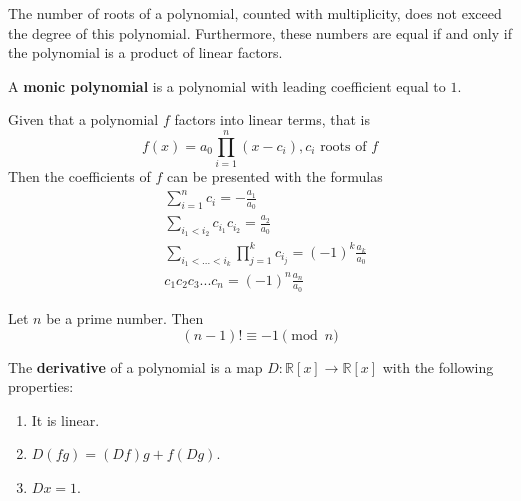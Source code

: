 \documentclass{article}
\begin{document}
      \begin{theorem}
        The number of roots of a polynomial, counted with multiplicity, does not exceed the degree of this polynomial. Furthermore, these numbers are equal if and only if the polynomial is a product of linear factors.
      \end{theorem}

      \begin{definition}
        A \textbf{monic polynomial} is a polynomial with leading coefficient equal to $1$. 
      \end{definition}

      \begin{theorem}
        Given that a polynomial $f$ factors into linear terms, that is 
        \begin{equation}
          f(x) = a_0 \prod_{i = 1}^{n} (x - c_i), c_i \text{ roots of } f
        \end{equation}
        Then the coefficients of $f$ can be presented with the formulas
        \begin{align*}
          & \sum_{i=1}^n c_i = - \frac{a_1}{a_0} \\
          & \sum_{i_1 < i_2} c_{i_1} c_{i_2} = \frac{a_2}{a_0} \\
          & \sum_{i_1< ...< i_k} \prod_{j = 1}^{k} c_{i_j} = (-1)^k \frac{a_k}{a_0} \\
          & c_1 c_2 c_3 ... c_n = (-1)^n \frac{a_n}{a_0}
        \end{align*}
      \end{theorem}

      \begin{theorem}
        Let $n$ be a prime number. Then 
        \begin{equation}
          (n-1)! \equiv -1 \pmod{n}
        \end{equation}
      \end{theorem}

      \begin{definition}
        The \textbf{derivative} of a polynomial is a map $D: \mathbb{R}[x] \longrightarrow \mathbb{R}[x]$ with the following properties:
        \begin{enumerate}
          \item It is linear. 
          \item $D(f g) = (D f) g + f (D g)$. 
          \item $D x = 1$. 
        \end{enumerate}
      \end{definition}
\end{document}
